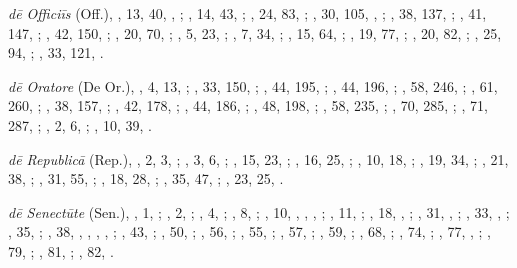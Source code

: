 \begin{autindex}
  \subitem \emph{dē Officiīs} (Off.),
    , 13,  40, , ;
    , 14,  43, ;
    , 24,  83, ;
    , 30, 105, , ;
    , 38, 137, ;
    , 41, 147, ;
    , 42, 150, ;
    , 20,  70, ;
    ,  5,  23, ;
    ,  7,  34, ;
    , 15,  64, ;
    , 19,  77, ;
    , 20,  82, ;
    , 25,  94, ;
    , 33, 121, .

  \subitem \emph{dē Oratore} (De Or.),
    ,  4,  13, ;
    , 33, 150, ;
    , 44, 195, ;
    , 44, 196, ;
    , 58, 246, ;
    , 61, 260, ;
    , 38, 157, ;
    , 42, 178, ;
    , 44, 186, ;
    , 48, 198, ;
    , 58, 235, ;
    , 70, 285, ;
    , 71, 287, ;
    ,  2,   6, ;
    , 10,  39, .

  \subitem \emph{dē Republicā} (Rep.),
    ,  2,  3, ;
    ,  3,  6, ;
    , 15, 23, ;
    , 16, 25, ;
    , 10, 18, ;
    , 19, 34, ;
    , 21, 38, ;
    , 31, 55, ;
    , 18, 28, ;
    , 35, 47, ;
    , 23, 25, .

  \subitem \emph{dē Senectūte} (Sen.),
    ,  1, ;
    ,  2, ;
    ,  4, ;
    ,  8, ;
    , 10, , , , ;
    , 11, ;
    , 18, , ;
    , 31, , ;
    , 33, , ;
    , 35, ;
    , 38, , , , , ;
    , 43, ;
    , 50, ;
    , 56, ;
    , 55, ;
    , 57, ;
    , 59, ;
    , 68, ;
    , 74, ;
    , 77, , ;
    , 79, ;
    , 81, ;
    , 82, .


\end{autindex}
